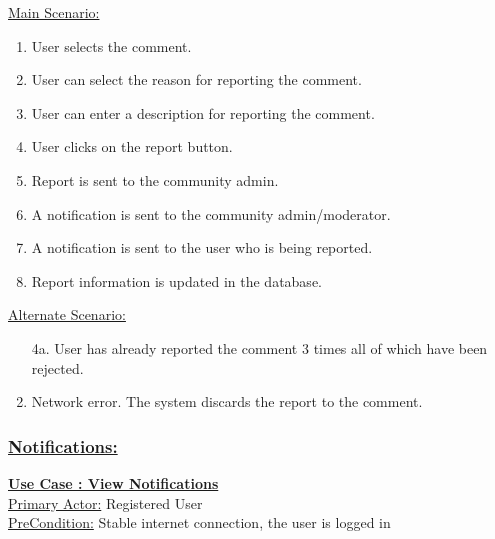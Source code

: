 \documentclass[conference,compsoc]{IEEEtran}
\newcounter{UC}
\newcommand{\nextU}{\stepcounter{UC}\theUC}
\begin{document}
\underline{Main Scenario:}\\
\begin{enumerate}
    \item User selects the comment.
    \item User can select the reason for reporting the comment.
    \item User can enter a description for reporting the comment.
    \item User clicks on the report button.
    \item Report is sent to the community admin.
    \item A notification is sent to the community admin/moderator.
    \item A notification is sent to the user who is being reported.
    \item Report information is updated in the database.
\end{enumerate}

\underline{Alternate Scenario:}\\
\begin{enumerate}
    \item [4a.] User has already reported the comment 3 times all of which have been rejected.
    \item Network error. The system discards the report to the comment.
\end{enumerate}\vspace{0.2cm}

\subsubsection{\underline{Notifications:}}

\underline{\textbf{Use Case \nextU: View Notifications}}\\

\underline{Primary Actor:} Registered User\\

\underline{PreCondition:} Stable internet connection, the user is logged in\\
\end{document}

